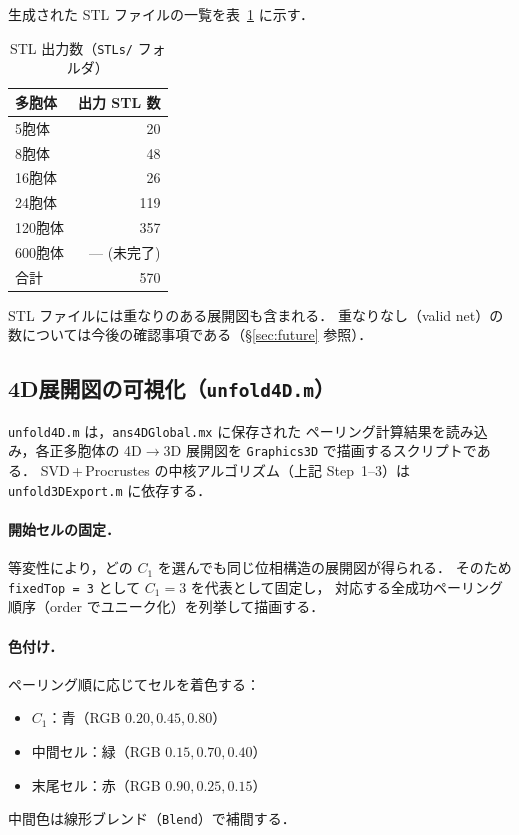 \documentclass[12pt,a4paper]{article}
\theoremstyle{definition}
\begin{document}
生成された STL ファイルの一覧を表~\ref{tab:stlcount} に示す．

\begin{table}[h]
\centering
\caption{STL 出力数（\texttt{STLs/} フォルダ）}
\label{tab:stlcount}
\begin{tabular}{lr}
\toprule
多胞体 & 出力 STL 数 \\
\midrule
5胞体   &   20 \\
8胞体   &   48 \\
16胞体  &   26 \\
24胞体  &  119 \\
120胞体 &  357 \\
600胞体 &  — (未完了) \\
\midrule
合計    &  570 \\
\bottomrule
\end{tabular}
\end{table}

\noindent
STL ファイルには重なりのある展開図も含まれる．
重なりなし（valid net）の数については今後の確認事項である（\S\ref{sec:future} 参照）．

\subsection{4D展開図の可視化（\texttt{unfold4D.m}）}
\label{ssec:unfold4D}

\texttt{unfold4D.m} は，\texttt{ans4DGlobal.mx} に保存された
ペーリング計算結果を読み込み，各正多胞体の 4D$\to$3D 展開図を
\texttt{Graphics3D} で描画するスクリプトである．
SVD\,+\,Procrustes の中核アルゴリズム（上記 Step~1--3）は
\texttt{unfold3DExport.m} に依存する．

\paragraph{開始セルの固定．}
等変性により，どの $C_1$ を選んでも同じ位相構造の展開図が得られる．
そのため \texttt{fixedTop = 3} として $C_1 = 3$ を代表として固定し，
対応する全成功ペーリング順序（order でユニーク化）を列挙して描画する．

\paragraph{色付け．}
ペーリング順に応じてセルを着色する：
\begin{itemize}
  \item $C_1$：青（RGB $0.20, 0.45, 0.80$）
  \item 中間セル：緑（RGB $0.15, 0.70, 0.40$）
  \item 末尾セル：赤（RGB $0.90, 0.25, 0.15$）
\end{itemize}
中間色は線形ブレンド（\texttt{Blend}）で補間する．
\end{document}
